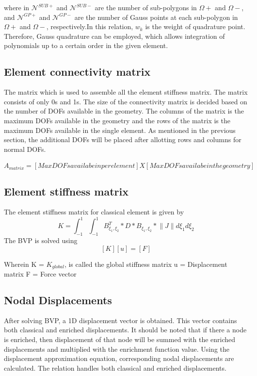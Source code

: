 \documentclass[fleqn, 12.5pt,a4paper]{report}
\newcommand\tab[1][1cm]{\hspace*{#1}}
\begin{document}
where in ${\mathscr{N}^{SUB+}}$ and ${\mathscr{N}^{SUB-}}$ are the number of sub-polygons in $\Omega+$ and $\Omega-$, and ${\mathscr{N}^{GP+}}$ and ${\mathscr{N}^{GP-}}$ are the number of Gauss points at each sub-polygon in $\Omega+$ and $\Omega-$, respectively.In this relation, $w_k$ is the weight of quadrature point. Therefore, Gauss quadrature can be employed, which allows integration of polynomials up to a certain order in the given element. 

\subsection{\color{Black} {Element connectivity matrix}}
The matrix which is used to assemble all the element stiffness matrix. The matrix consists of only 0s and 1s. The size of the connectivity matrix is decided based on the number of DOFs available in the geometry. The columns of the matrix is the maximum DOFs available in the geometry and the rows of the matrix is the maximum DOFs available in the single element. As mentioned in the previous section, the additional DOFs will be placed after allotting rows and columns for normal DOFs.  

$A_{matrix} = [Max DOFs availabe in per element] X [Max DOFs availabe in the geometry]$ 

\subsection{\color{Black} {Element stiffness matrix}}
The element stiffness matrix for classical element is given by \cite{khoei2014extended}
$$ K = \int_{-1}^{1} \int_{-1}^{1} B_{\xi_1, \xi_2}^T*D*B_{\xi_1, \xi_2}*\lVert J \rVert d\xi_1d\xi_2 $$
The BVP is solved using
    $$ [K][u] = [F]$$

Wherein \newline
\tab[1cm] K = $K_{global}$, is called the global stiffness matrix\newline
\tab[1cm] u = Displacement matrix\newline
\tab[1cm] F = Force vector

\subsection{\color{Black} {Nodal Displacements}}
After solving BVP, a 1D displacement vector is obtained. This vector contains both classical and enriched displacements. It should be noted that if there a node is enriched, then displacement of that node will be summed with the enriched displacements and multiplied with the enrichment function value. Using the displacement approximation equation, corresponding nodal displacements are calculated. The relation handles both classical and enriched displacements.
\end{document}

